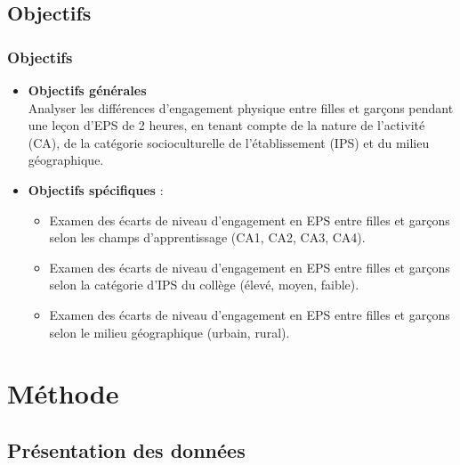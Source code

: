 \documentclass{beamer}
\begin{document}
	\subsection{Objectifs}
	\begin{frame}
		\frametitle{Objectifs} 
		\begin{itemize}
			\item \textbf{Objectifs générales} \\
			Analyser les différences d'engagement physique entre filles et garçons pendant une leçon d'EPS de 2 heures, en tenant compte de la nature de l'activité (CA), de la catégorie socioculturelle de l'établissement (IPS) et du milieu géographique.
			\vfill
			\pause
			\item \textbf{Objectifs spécifiques} :
				\begin{itemize}
					\item Examen des écarts de niveau d'engagement en EPS entre filles et garçons selon les champs d'apprentissage (CA1, CA2, CA3, CA4).
					\item Examen des écarts de niveau d'engagement en EPS entre filles et garçons selon la catégorie d’IPS du collège (élevé, moyen, faible).
					\item Examen des écarts de niveau d'engagement en EPS entre filles et garçons selon le milieu géographique (urbain, rural).
				\end{itemize}
		\end{itemize}
	\end{frame}

	\section{Méthode}
	\begin{frame}
		\tableofcontents[sections={2}]
	\end{frame}
	\subsection{Présentation des données}
		
\end{document}
